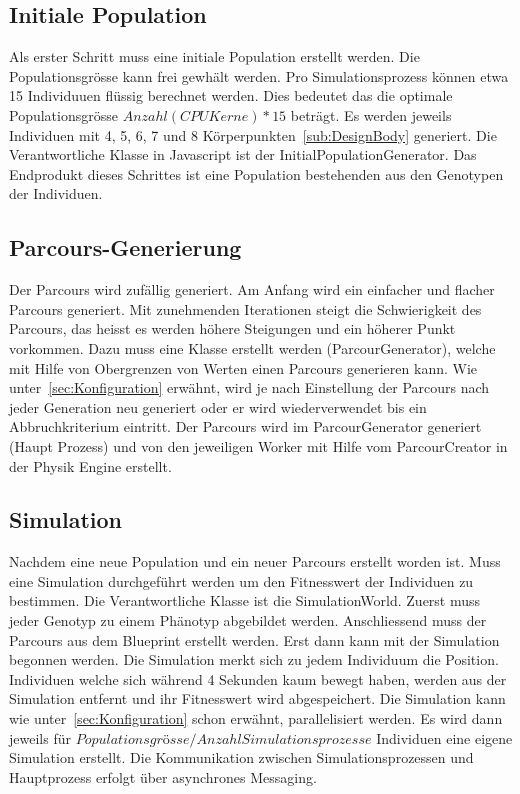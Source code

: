     \subsection{Initiale Population\label{sec:Initiale Polulation}}

      Als erster Schritt muss eine initiale Population erstellt werden. Die Populationsgrösse kann frei gewhält werden.
      Pro Simulationsprozess können etwa 15 Individuuen flüssig berechnet werden.
      Dies bedeutet das die optimale Populationsgrösse  \( Anzahl(CPU Kerne) * 15 \) beträgt.
      Es werden jeweils Individuen mit 4, 5, 6, 7 und 8 Körperpunkten~\ref{sub:DesignBody} generiert.
      Die Verantwortliche Klasse in Javascript ist der InitialPopulationGenerator.
      Das Endprodukt dieses Schrittes ist eine Population bestehenden aus den Genotypen der Individuen.

    \subsection{Parcours-Generierung\label{sec:Parcour Generierung}}

      Der Parcours wird zufällig generiert. Am Anfang wird ein einfacher und flacher Parcours generiert.
      Mit zunehmenden Iterationen steigt die Schwierigkeit des Parcours,
      das heisst es werden höhere Steigungen und ein höherer Punkt vorkommen.
      Dazu muss eine Klasse erstellt werden (ParcourGenerator),
      welche mit Hilfe von Obergrenzen von Werten einen Parcours generieren kann.
      Wie unter~\ref{sec:Konfiguration} erwähnt,
      wird je nach Einstellung der Parcours nach jeder Generation neu generiert oder er wird wiederverwendet
      bis ein Abbruchkriterium eintritt.
      Der Parcours wird im ParcourGenerator generiert (Haupt Prozess) und
      von den jeweiligen Worker mit Hilfe vom ParcourCreator in der Physik Engine erstellt.

    \subsection{Simulation}

      Nachdem eine neue Population und ein neuer Parcours erstellt worden ist.
      Muss eine Simulation durchgeführt werden um den Fitnesswert der Individuen zu bestimmen.
      Die Verantwortliche Klasse ist die SimulationWorld.
      Zuerst muss jeder Genotyp zu einem Phänotyp abgebildet werden.
      Anschliessend muss der Parcours aus dem Blueprint erstellt werden.
      Erst dann kann mit der Simulation begonnen werden.
      Die Simulation merkt sich zu jedem Individuum die Position.
      Individuen welche sich während 4 Sekunden kaum bewegt haben,
      werden aus der Simulation entfernt und ihr Fitnesswert wird abgespeichert.
      Die Simulation kann wie unter~\ref{sec:Konfiguration} schon erwähnt, parallelisiert werden.
      Es wird dann jeweils für \( Populationsgrösse / Anzahl Simulationsprozesse \) Individuen eine eigene Simulation erstellt.
      Die Kommunikation zwischen Simulationsprozessen und Hauptprozess erfolgt über asynchrones Messaging.

